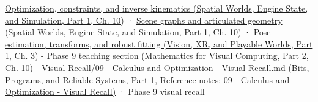 \href{../05-Spatial-Worlds-Engine-State-and-Simulation-P01/main.pdf\#nameddest=04-visual-computing-ii-ch029-optimization-constraints-and-inverse-kinematics}{Optimization, constraints, and inverse kinematics (Spatial Worlds, Engine State, and Simulation, Part 1, Ch. 10)} · \href{../05-Spatial-Worlds-Engine-State-and-Simulation-P01/main.pdf\#nameddest=04-visual-computing-ii-ch029-scene-graphs-and-articulated-geometry}{Scene graphs and articulated geometry (Spatial Worlds, Engine State, and Simulation, Part 1, Ch. 10)} · \href{../07-Vision-XR-and-Playable-Worlds-P01/main.pdf\#nameddest=04-visual-computing-ii-ch032-pose-estimation-transforms-and-robust-fitting}{Pose estimation, transforms, and robust fitting (Vision, XR, and Playable Worlds, Part 1, Ch. 3)} - \href{../02-Mathematics-for-Visual-Computing-P02/main.pdf\#nameddest=02-foundations-ii-ch026-optimization-and-inverse-problems}{Phase 9 teaching section (Mathematics for Visual Computing, Part 2, Ch. 10)} - \href{../01-Bits-Programs-and-Reliable-Systems-P01/main.pdf\#nameddest=appendix-adf48f5dc5c1}{Visual Recall/09 - Calculus and Optimization - Visual Recall.md (Bits, Programs, and Reliable Systems, Part 1, Reference notes: 09 - Calculus and Optimization - Visual Recall)} · Phase 9 visual recall
